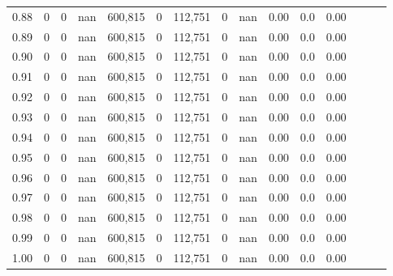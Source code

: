 \begin{tabular}{rrrrrrrrrrrrrrr}
0.88 &        0 &       0 &   nan &  600,815 &        0 &  112,751 &        0 &   nan &  0.00 &                     0.0 &      0.00 \\
0.89 &        0 &       0 &   nan &  600,815 &        0 &  112,751 &        0 &   nan &  0.00 &                     0.0 &      0.00 \\
0.90 &        0 &       0 &   nan &  600,815 &        0 &  112,751 &        0 &   nan &  0.00 &                     0.0 &      0.00 \\
0.91 &        0 &       0 &   nan &  600,815 &        0 &  112,751 &        0 &   nan &  0.00 &                     0.0 &      0.00 \\
0.92 &        0 &       0 &   nan &  600,815 &        0 &  112,751 &        0 &   nan &  0.00 &                     0.0 &      0.00 \\
0.93 &        0 &       0 &   nan &  600,815 &        0 &  112,751 &        0 &   nan &  0.00 &                     0.0 &      0.00 \\
0.94 &        0 &       0 &   nan &  600,815 &        0 &  112,751 &        0 &   nan &  0.00 &                     0.0 &      0.00 \\
0.95 &        0 &       0 &   nan &  600,815 &        0 &  112,751 &        0 &   nan &  0.00 &                     0.0 &      0.00 \\
0.96 &        0 &       0 &   nan &  600,815 &        0 &  112,751 &        0 &   nan &  0.00 &                     0.0 &      0.00 \\
0.97 &        0 &       0 &   nan &  600,815 &        0 &  112,751 &        0 &   nan &  0.00 &                     0.0 &      0.00 \\
0.98 &        0 &       0 &   nan &  600,815 &        0 &  112,751 &        0 &   nan &  0.00 &                     0.0 &      0.00 \\
0.99 &        0 &       0 &   nan &  600,815 &        0 &  112,751 &        0 &   nan &  0.00 &                     0.0 &      0.00 \\
1.00 &        0 &       0 &   nan &  600,815 &        0 &  112,751 &        0 &   nan &  0.00 &                     0.0 &      0.00 \\
\bottomrule
\end{tabular}
